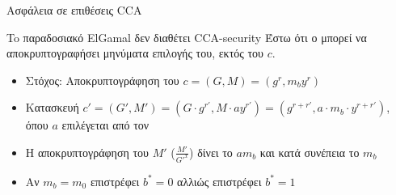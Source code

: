 \documentclass[handout]{beamer}
\begin{document}
\begin{frame}{Ασφάλεια σε επιθέσεις CCA}
 
\begin{block}{To παραδοσιακό ElGamal δεν διαθέτει CCA-security}
Έστω ότι ο \adv  μπορεί να αποκρυπτογραφήσει μηνύματα επιλογής του, εκτός του $c$.
\begin{itemize}
\item Στόχος: Αποκρυπτογράφηση του $c = (G,M) = (g^r, m_b y^r)$
\pause
\item Κατασκευή $c' = (G',M') = (G \cdot g^{r'}, M \cdot a y^{r'}) = (g^{r+r'}, a \cdot m_b \cdot y^{r+r'}) $, όπου $a$ επιλέγεται από τον  \adv 
\pause
\item H αποκρυπτογράφηση του $M'$ ($\frac{M'}{G'^x}$) δίνει το $am_b$ και κατά συνέπεια το $m_b$
\pause
\item Αν $m_b = m_0$ επιστρέφει $b^*=0$ αλλιώς επιστρέφει $b^*=1$
\end{itemize}
\end{block}

\end{frame}
\end{document}
